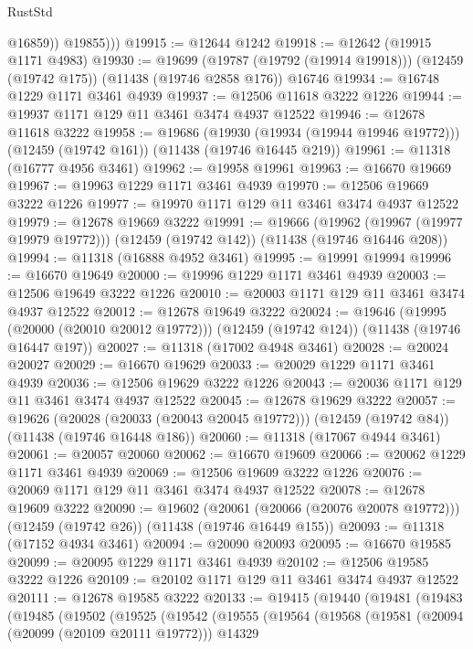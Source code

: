 \begin{lexlean}{RustStd}
\begin{coremodule}
              @16859))
          @19855)))
@19915 := @12644 @1242
@19918 := @12642 (@19915 @1171 @4983)
@19930 := @19699
    (@19787 (@19792 (@19914 @19918)))
    (@12459 (@19742 @175))
    (@11438 (@19746 @2858 @176))
    @16746
@19934 := @16748 @1229 @1171 @3461 @4939
@19937 := @12506 @11618 @3222 @1226
@19944 := @19937 @1171 @129 @11 @3461 @3474 @4937 @12522
@19946 := @12678 @11618 @3222
@19958 := @19686
    (@19930 (@19934 (@19944 @19946 @19772)))
    (@12459 (@19742 @161))
    (@11438 (@19746 @16445 @219))
@19961 := @11318 (@16777 @4956 @3461)
@19962 := @19958 @19961
@19963 := @16670 @19669
@19967 := @19963 @1229 @1171 @3461 @4939
@19970 := @12506 @19669 @3222 @1226
@19977 := @19970 @1171 @129 @11 @3461 @3474 @4937 @12522
@19979 := @12678 @19669 @3222
@19991 := @19666
    (@19962 (@19967 (@19977 @19979 @19772)))
    (@12459 (@19742 @142))
    (@11438 (@19746 @16446 @208))
@19994 := @11318 (@16888 @4952 @3461)
@19995 := @19991 @19994
@19996 := @16670 @19649
@20000 := @19996 @1229 @1171 @3461 @4939
@20003 := @12506 @19649 @3222 @1226
@20010 := @20003 @1171 @129 @11 @3461 @3474 @4937 @12522
@20012 := @12678 @19649 @3222
@20024 := @19646
    (@19995 (@20000 (@20010 @20012 @19772)))
    (@12459 (@19742 @124))
    (@11438 (@19746 @16447 @197))
@20027 := @11318 (@17002 @4948 @3461)
@20028 := @20024 @20027
@20029 := @16670 @19629
@20033 := @20029 @1229 @1171 @3461 @4939
@20036 := @12506 @19629 @3222 @1226
@20043 := @20036 @1171 @129 @11 @3461 @3474 @4937 @12522
@20045 := @12678 @19629 @3222
@20057 := @19626
    (@20028 (@20033 (@20043 @20045 @19772)))
    (@12459 (@19742 @84))
    (@11438 (@19746 @16448 @186))
@20060 := @11318 (@17067 @4944 @3461)
@20061 := @20057 @20060
@20062 := @16670 @19609
@20066 := @20062 @1229 @1171 @3461 @4939
@20069 := @12506 @19609 @3222 @1226
@20076 := @20069 @1171 @129 @11 @3461 @3474 @4937 @12522
@20078 := @12678 @19609 @3222
@20090 := @19602
    (@20061 (@20066 (@20076 @20078 @19772)))
    (@12459 (@19742 @26))
    (@11438 (@19746 @16449 @155))
@20093 := @11318 (@17152 @4934 @3461)
@20094 := @20090 @20093
@20095 := @16670 @19585
@20099 := @20095 @1229 @1171 @3461 @4939
@20102 := @12506 @19585 @3222 @1226
@20109 := @20102 @1171 @129 @11 @3461 @3474 @4937 @12522
@20111 := @12678 @19585 @3222
@20133 := @19415
    (@19440
      (@19481
        (@19483
          (@19485
            (@19502
              (@19525
                (@19542
                  (@19555
                    (@19564
                      (@19568
                        (@19581
                          (@20094 (@20099 (@20109 @20111 @19772)))
                          @14329

\end{coremodule}
\end{lexlean}
